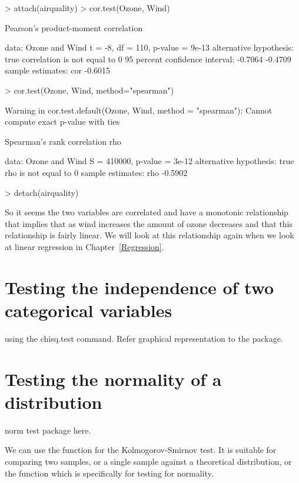 \begin{Schunk}
\begin{Sinput}
> attach(airquality) 
> cor.test(Ozone, Wind) 
\end{Sinput}
\begin{Soutput}

	Pearson's product-moment correlation

data:  Ozone and Wind
t = -8, df = 110, p-value = 9e-13
alternative hypothesis: true correlation is not equal to 0
95 percent confidence interval:
 -0.7064 -0.4709
sample estimates:
    cor 
-0.6015 
\end{Soutput}
\begin{Sinput}
> cor.test(Ozone, Wind, method="spearman") 
\end{Sinput}
\begin{Soutput}
Warning in cor.test.default(Ozone, Wind, method = "spearman"): Cannot compute exact p-value with ties
\end{Soutput}
\begin{Soutput}

	Spearman's rank correlation rho

data:  Ozone and Wind
S = 410000, p-value = 3e-12
alternative hypothesis: true rho is not equal to 0
sample estimates:
    rho 
-0.5902 
\end{Soutput}
\begin{Sinput}
> detach(airquality) 
\end{Sinput}
\end{Schunk}

So it seems the two variables are correlated and have a monotonic relationship that implies that as wind increases the amount of ozone decreases and that this relationship is fairly linear. We will look at this relationship again when we look at linear regression in Chapter~\ref{Regression}. 
 
 
 
 
 
\section{Testing the independence of two categorical variables} 
using the chisq.test command. 
Refer graphical representation to the  package. 
 
\section{Testing the normality of a distribution} 
\label{NormalityTests}

 
norm test package here. 
 
We can use the  function for the Kolmogorov-Smirnov test. It is suitable for comparing two samples, or a single sample against a theoretical distribution, or the  function which is specifically for testing for normality. 
 

